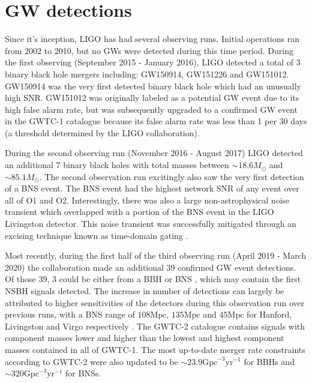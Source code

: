 \section{GW detections}

%
%

Since it's inception, \ac{LIGO} has had several observing runs. 
Initial operations ran from 2002 to 2010, but no \ac{GW}s were 
detected during this time period.
During the first observing (September 2015 - January 2016), 
\ac{LIGO} detected a total of $3$ binary 
black hole mergers including: GW150914, GW151226 and GW151012. GW150914 was 
the very first detected binary black hole which had an unusually high 
\ac{SNR}. GW151012 was originally labeled as a potential GW event due to 
its high false alarm rate, but was subsequently upgraded to a confirmed 
\ac{GW} event in the GWTC-1 catalogue \cite{1811.12907} because its 
false alarm rate was less than 1 per 30 days (a threshold determined 
by the \ac{LIGO} collaboration). 

%
%
During the second observing run (November 2016 - August 2017) 
\ac{LIGO} detected an 
additional $7$ binary black holes with total masses between 
$\sim 18.6 M_\odot$ and $\sim 85.1 M_\odot$. The second observation run 
excitingly also saw the very first detection of a \ac{BNS} event. 
The \ac{BNS} event had the highest network \ac{SNR} of 
any event over all of O1 and O2. Interestingly, there was also 
a large non-astrophysical noise transient which overlapped 
with a portion of the \ac{BNS} event in the \ac{LIGO} Livingston 
detector. This noise transient was successfully mitigated through an 
excising technique known as time-domain gating \cite{PhysRevLett.119.161101}.

%
%
Most recently, during the first half of the third observing run 
(April 2019 - March 2020) the collaboration made an 
additional $39$ confirmed \ac{GW} event detections. Of those $39$, 
3 could be either from a \ac{BBH} 
or \ac{BNS} \cite{1811.12907, 2010.14527}, which may contain the first 
\ac{NSBH} signals detected. The increase in number of 
detections can largely be attributed to higher sensitivities of the 
detectors during this observation run over previous runs, with a \ac{BNS} range 
of $108 \mathrm{Mpc}$, $135 \mathrm{Mpc}$ and $45 \mathrm{Mpc}$ 
for Hanford, Livingston and Virgo respectively \cite{2010.14527}. The 
GWTC-2 catalogue contains signals with component masses lower and higher 
than the lowest and highest component masses contained in all of 
GWTC-1. The most up-to-date merger rate constraints according to GWTC-2 were 
also updated to be $\sim 23.9 \mathrm{Gpc}^{-3} \mathrm{yr}^{-1}$ for 
\ac{BBH}s and $\sim 320 \mathrm{Gpc}^{-3} \mathrm{yr}^{-1}$ for 
\ac{BNS}s.

